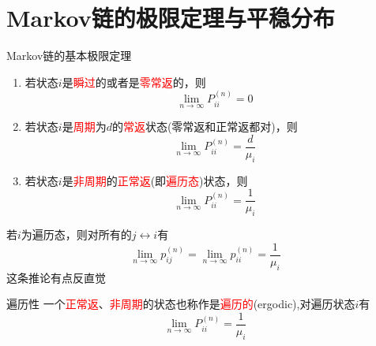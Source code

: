 \documentclass{elegantbook}
\begin{document}
\section{Markov链的极限定理与平稳分布}
\begin{theorem}{Markov链的基本极限定理}{}
    \begin{enumerate}
        \item 若状态$i$是\textcolor{red}{瞬过}的或者是\textcolor{red}{零常返}的，则\[\lim_{n \to \infty}P_{ii}^{(n)}=0\]
        \item 若状态$i$是\textcolor{red}{周期}为$d$的\textcolor{red}{常返}状态(零常返和正常返都对)，则\[\lim_{n \to \infty}P_{ii}^{(n)}=\frac{d}{\mu _i}\]
        \item 若状态$i$是\textcolor{red}{非周期}的\textcolor{red}{正常返}(即\textcolor{red}{遍历态})状态，则\[\lim_{n \to \infty}P_{ii}^{(n)}=\frac{1}{\mu _i}\]
    \end{enumerate}
\end{theorem}
\begin{corollary}{}{}
    若$i$为遍历态，则对所有的$j\leftrightarrow i$有\[\lim_{n \to \infty}p_{ij}^{(n)}=\lim_{n \to \infty}p_{ii}^{(n)}=\frac{1}{\mu _i}\]
    这条推论有点反直觉
\end{corollary}
\begin{definition}{遍历性}{}
    一个\textcolor{red}{正常返}、\textcolor{red}{非周期}的状态也称作是\textcolor{red}{遍历的}(ergodic),对遍历状态$i$有
    \[\lim_{n \to \infty}P_{ii}^{(n)}=\frac{1}{\mu _i}\]
\end{definition}
\end{document}
